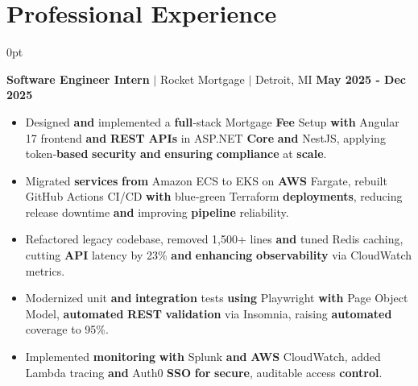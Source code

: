 \documentclass[letterpaper,10pt]{article}
\newlength{\contentindent}
\newcommand{\sectioncontent}[1]{%
  \begin{adjustwidth}{\contentindent}{0pt}%
  #1%
  \end{adjustwidth}%
}
\begin{document}
\section{Professional Experience}
\sectioncontent{
\textbf{Software Engineer Intern} $|$ Rocket Mortgage $|$ Detroit, MI \hfill \textbf{May 2025 - Dec 2025}
\begin{itemize}
    \item Designed \textbf{and} implemented a \textbf{full}‑stack Mortgage \textbf{Fee} Setup \textbf{with} Angular 17 frontend \textbf{and} \textbf{REST} \textbf{APIs} in ASP.NET \textbf{Core} \textbf{and} NestJS, applying token‑\textbf{based} \textbf{security} \textbf{and} \textbf{ensuring} \textbf{compliance} at \textbf{scale}.
    \item Migrated \textbf{services} \textbf{from} Amazon ECS to EKS on \textbf{AWS} Fargate, rebuilt GitHub Actions CI/CD \textbf{with} blue‑green Terraform \textbf{deployments}, reducing release downtime \textbf{and} improving \textbf{pipeline} reliability.
    \item Refactored legacy codebase, removed 1,500+ lines \textbf{and} tuned Redis caching, cutting \textbf{API} latency by 23\% \textbf{and} \textbf{enhancing} \textbf{observability} via CloudWatch metrics.
    \item Modernized unit \textbf{and} \textbf{integration} tests \textbf{using} Playwright \textbf{with} Page Object Model, \textbf{automated} \textbf{REST} \textbf{validation} via Insomnia, raising \textbf{automated} coverage to 95\%.
    \item Implemented \textbf{monitoring} \textbf{with} Splunk \textbf{and} \textbf{AWS} CloudWatch, added Lambda tracing \textbf{and} Auth0 \textbf{SSO} \textbf{for} \textbf{secure}, auditable access \textbf{control}.
\end{itemize}

}
\end{document}
